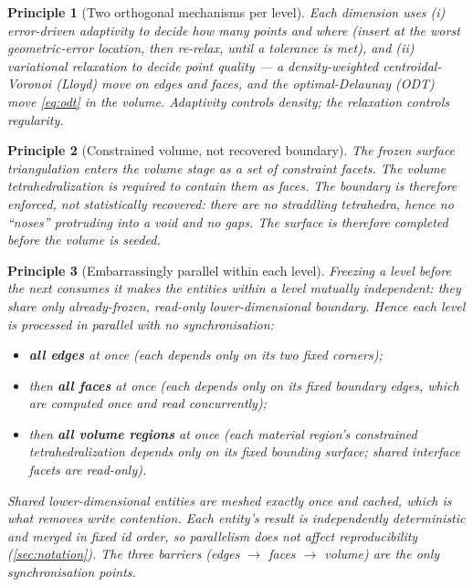 \documentclass[11pt,a4paper]{article}
\numberwithin{equation}{section}
\newtheorem{principle}{Principle}[section]
\begin{document}
\begin{principle}[Two orthogonal mechanisms per level]
Each dimension uses (i) \emph{error-driven adaptivity} to decide \emph{how many}
points and \emph{where} (insert at the worst geometric-error location, then
re-relax, until a tolerance is met), and (ii) \emph{variational relaxation} to
decide \emph{point quality} --- a density-weighted centroidal-Voronoi (Lloyd) move
on edges and faces, and the optimal-Delaunay (ODT) move \eqref{eq:odt} in the
volume. Adaptivity controls density; the relaxation controls regularity.
\end{principle}

\begin{principle}[Constrained volume, not recovered boundary]
The frozen surface triangulation enters the volume stage as a set of
\emph{constraint facets}. The volume tetrahedralization is required to contain
them as faces. The boundary is therefore \emph{enforced}, not statistically
recovered: there are no straddling tetrahedra, hence no ``noses'' protruding
into a void and no gaps. The surface is therefore completed \emph{before} the
volume is seeded.
\end{principle}

\begin{principle}[Embarrassingly parallel within each level]
\label{prin:parallel}
Freezing a level before the next consumes it makes the entities \emph{within} a
level mutually independent: they share only already-frozen, read-only
lower-dimensional boundary. Hence each level is processed in parallel with no
synchronisation:
\begin{itemize}[topsep=2pt,itemsep=1pt]
\item \textbf{all edges} at once (each depends only on its two fixed corners);
\item then \textbf{all faces} at once (each depends only on its fixed boundary
edges, which are computed once and read concurrently);
\item then \textbf{all volume regions} at once (each material region's
constrained tetrahedralization depends only on its fixed bounding surface;
shared interface facets are read-only).
\end{itemize}
Shared lower-dimensional entities are meshed exactly once and cached, which is
what removes write contention. Each entity's result is independently
deterministic and merged in fixed id order, so parallelism does not affect
reproducibility (\cref{sec:notation}). The three barriers (edges $\to$ faces
$\to$ volume) are the only synchronisation points.
\end{principle}
\end{document}
